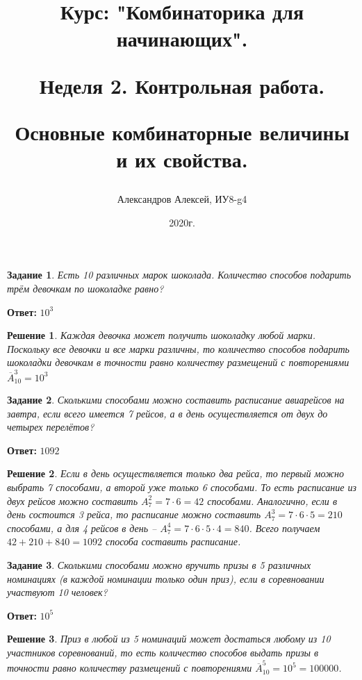 \documentclass[a4paper,oneside]{memoir}
\title{Курс: "Комбинаторика для начинающих".
	
Неделя 2. Контрольная работа.
	 
Основные комбинаторные величины и их свойства.}
\author{Александров Алексей, ИУ8-g4}
\date{2020г.}
\newtheorem{task}{Задание}
\newtheorem{solution}{Решение}
\begin{document}
	
\maketitle

\begin{task}
	Есть 10 различных марок шоколада. Количество способов подарить трём девочкам по шоколадке равно?
\end{task}

\textbf{Ответ:} $ 10^{3} $

\begin{solution}
Каждая девочка может получить шоколадку любой марки. Поскольку все девочки и все марки различны, то количество способов подарить шоколадки девочкам в точности равно количеству размещений с повторениями $ \overline{A}_{10}^3 = 10^3 $
\end{solution}

\hrulefill

\begin{task}
Сколькими способами можно составить расписание авиарейсов на завтра, если всего имеется 7 рейсов, а в день осуществляется от двух до четырех перелётов?

\end{task}

\textbf{Ответ:} $ 1092 $

\begin{solution}
	Если в день осуществляется только два рейса, то первый можно выбрать 7 способами, а второй уже только 6 способами. То есть расписание из двух рейсов можно составить $ A_7^2 = 7\cdot 6 = 42 $ способами. Аналогично, если в день состоится 3 рейса, то расписание можно составить $ A_7^3 = 7\cdot 6\cdot 5 = 210 $ способами, а для 4 рейсов в день -- $ A_7^4 = 7\cdot 6\cdot 5\cdot 4 = 840 $. Всего получаем $ 42+210+840=1092 $ способа составить расписание.
\end{solution}

\hrulefill

\begin{task}
Сколькими способами можно вручить призы в 5 различных номинациях (в каждой номинации только один приз), если в соревновании участвуют 10 человек?
\end{task}

\textbf{Ответ:} $ 10^5 $

\begin{solution}
Приз в любой из 5 номинаций может достаться любому из 10 участников соревнований, то есть количество способов выдать призы в точности равно количеству размещений с повторениями $ \overline{A}_{10}^5 = 10^5 = 100000 $.
\end{solution}
\end{document}
